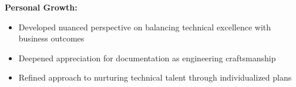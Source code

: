 \documentclass[a4paper,10pt]{article}
\begin{document}
{\begin{minipage}{\dimexpr\textwidth-2\fboxsep\relax}
		\vspace{0.2cm}
		\textbf{Personal Growth:}
		\vspace{0.2cm}
		\begin{itemize}[label=\textcolor{darkblue}{\textbullet}, leftmargin=*, nosep]
			\item Developed nuanced perspective on balancing technical excellence with business outcomes
			\item Deepened appreciation for documentation as engineering craftsmanship
			\item Refined approach to nurturing technical talent through individualized plans
		\end{itemize}

		\vspace{0.2cm} %
		    \end{minipage}}
\end{document}
